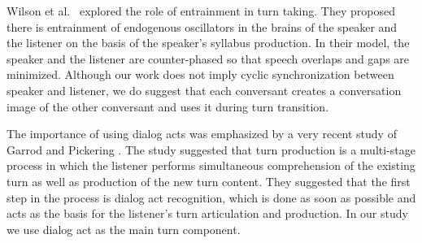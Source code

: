 Wilson et al.~\cite{wilson2005oscillator} explored the role of entrainment in turn taking. They proposed there is entrainment of endogenous oscillators in the brains of the speaker and the listener on the basis of the speaker's syllabus production. In their model, the speaker and the listener are counter-phased so that speech overlaps and gaps are minimized. Although our work does not imply cyclic synchronization between speaker and listener, we do suggest that each conversant creates a conversation image of the other conversant and uses it during turn transition.

The importance of using dialog acts was emphasized by a very recent study of Garrod and Pickering \cite{garrod2015use}. The study suggested that turn production is a multi-stage process in which the listener performs simultaneous comprehension of the existing turn as well as production of the new turn content. They suggested that the first step in the process is dialog act recognition, which is done as soon as possible and acts as the basis for the listener's turn articulation and production. In our study we use dialog act as the main turn component.
